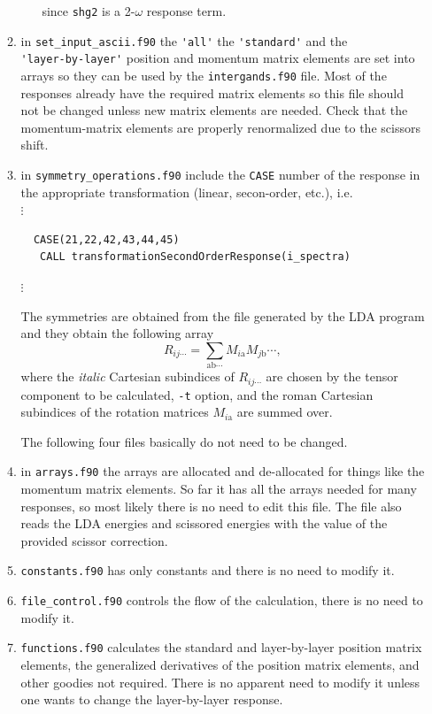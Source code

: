 \documentclass[12pt,leqno]{article}
\numberwithin{equation}{section}
\begin{document}
\begin{itemize}
\begin{enumerate}
\begin{itemize}
since \verb=shg2= is a 2-$\omega$ response term.
\end{itemize} 

\item in \verb=set_input_ascii.f90=
 the \verb='all'= the \verb='standard'= and the \\\verb='layer-by-layer'=
position and momentum matrix elements are set into arrays so they can be used by the 
\verb=intergands.f90= file. Most of the responses already have the required
matrix elements so this file should not be changed unless new matrix
elements are needed. Check that the momentum-matrix elements are
properly renormalized due to the scissors shift. 

\item in \verb=symmetry_operations.f90= include the \verb=CASE= number
  of the response in the appropriate transformation (linear,
  secon-order, etc.), i.e.\\
$\vdots$
\begin{verbatim}
  CASE(21,22,42,43,44,45)
   CALL transformationSecondOrderResponse(i_spectra)
\end{verbatim} 
$\vdots$

The symmetries are obtained from the file generated by the LDA program
and they obtain the following array
\begin{equation}\label{uno}
R_{ij\cdots}=\sum_{\mathrm{ab}\cdots}M_{i\mathrm{a}} M_{j\mathrm{b}}\cdots
,
\end{equation}
where the {\it italic} Cartesian subindices of $R_{ij\cdots}$ are chosen by the
tensor component to be calculated, \verb=-t= option, 
and the $\mathrm{roman}$
Cartesian subindices of the rotation matrices $M_{i\mathrm{a}}$ are
summed over.

The following four files basically do not need to be changed.
\item in \verb=arrays.f90= the arrays are allocated and de-allocated
  for things like the momentum matrix elements. So far it has all the
  arrays needed for many responses, so most likely there is no need to
  edit this file. The file also reads the LDA energies and scissored
  energies with the value of the provided scissor correction.

\item \verb=constants.f90= has only constants and there is no need to
modify it.
\item \verb=file_control.f90= controls the flow of the calculation,
there is no need to
modify it.
\item \verb=functions.f90= calculates the standard and  layer-by-layer position
  matrix elements, the generalized derivatives of the position matrix
  elements, and other goodies not required. 
There is no apparent need to
modify it unless one wants to change the layer-by-layer response.


\end{enumerate}
\end{itemize}
\end{document}
